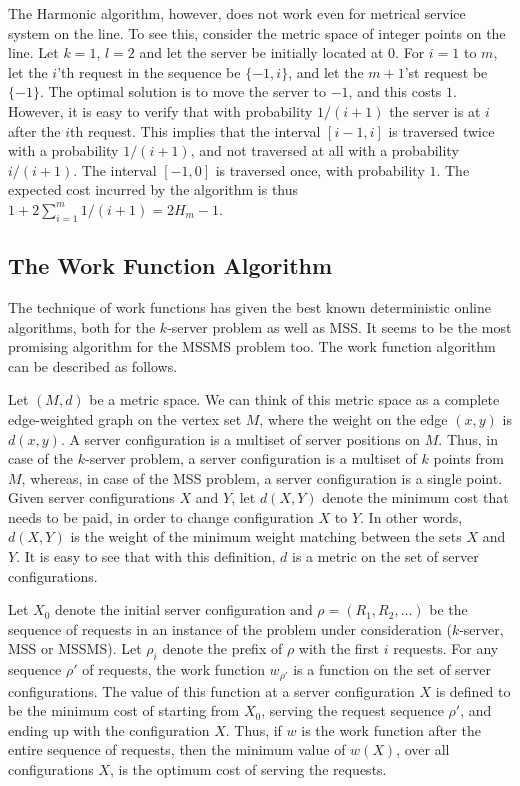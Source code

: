 \documentclass[11pt]{article}
\theoremstyle{plain}\newtheorem{theorem}{Theorem}
\theoremstyle{definition}
\theoremstyle{remark}
\begin{document}
The Harmonic algorithm, however, does not work even for metrical service system on the line. To see this, consider the metric space of integer points on the line. Let $k=1$, $l=2$ and let the server be initially located at $0$. For $i=1$ to $m$, let the $i$'th request in the sequence be $\{-1,i\}$, and let the $m+1$'st request be $\{-1\}$. The optimal solution is to move the server to $-1$, and this costs $1$. However, it is easy to verify that with probability $1/(i+1)$ the server is at $i$ after the $i$th request. This implies that the interval $[i-1,i]$ is traversed twice with a probability $1/(i+1)$, and not traversed at all with a probability $i/(i+1)$. The interval $[-1,0]$ is traversed once, with probability $1$. The expected cost incurred by the algorithm is thus $1+2\sum_{i=1}^{m}1/(i+1)=2H_m-1$. 


\subsection{The Work Function Algorithm}

The technique of work functions has given the best known deterministic online algorithms, both for the $k$-server problem as well as MSS. It seems to be the most promising algorithm for the MSSMS problem too. The work function algorithm can be described as follows.

Let $(M,d)$ be a metric space. We can think of this metric space as a complete edge-weighted graph on the vertex set $M$, where the weight on the edge $(x,y)$ is $d(x,y)$. A server configuration is a multiset of server positions on $M$. Thus, in case of the $k$-server problem, a server configuration is a multiset of $k$ points from $M$, whereas, in case of the MSS problem, a server configuration is a single point. Given server configurations $X$ and $Y$, let $d(X,Y)$ denote the minimum cost that needs to be paid, in order to change configuration $X$ to $Y$. In other words, $d(X,Y)$ is the weight of the minimum weight matching between the sets $X$ and $Y$. It is easy to see that with this definition, $d$ is a metric on the set of server configurations.

Let $X_0$ denote the initial server configuration and $\rho=(R_1,R_2,\ldots)$ be the sequence of requests in an instance of the problem under consideration ($k$-server, MSS or MSSMS). Let $\rho_i$ denote the prefix of $\rho$ with the first $i$ requests. For any sequence $\rho'$ of requests, the work function $w_{\rho'}$  
is a function on the set of server configurations. The value of this function at a server configuration $X$ is defined to be the minimum cost of starting from $X_0$, serving the request sequence $\rho'$, and ending up with the configuration $X$. Thus, if $w$ is the work function after the entire sequence of requests, then the minimum value of $w(X)$, over all configurations $X$, is the optimum cost of serving the requests.
\end{document}
